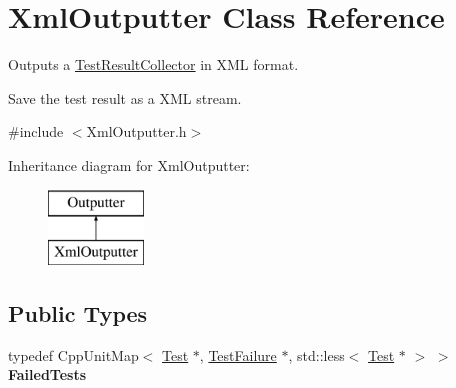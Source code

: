 \hypertarget{class_xml_outputter}{}\section{Xml\+Outputter Class Reference}
\label{class_xml_outputter}


Outputs a \hyperlink{class_test_result_collector}{Test\+Result\+Collector} in X\+ML format.

Save the test result as a X\+ML stream.  




{\ttfamily \#include $<$Xml\+Outputter.\+h$>$}

Inheritance diagram for Xml\+Outputter\+:\begin{figure}[H]
\begin{center}
\leavevmode
\includegraphics[height=2.000000cm]{class_xml_outputter}
\end{center}
\end{figure}
\subsection*{Public Types}
\begin{DoxyCompactItemize}
\item 
typedef Cpp\+Unit\+Map$<$ \hyperlink{class_test}{Test} $\ast$, \hyperlink{class_test_failure}{Test\+Failure} $\ast$, std\+::less$<$ \hyperlink{class_test}{Test} $\ast$ $>$ $>$ {\bfseries Failed\+Tests}\hypertarget{class_xml_outputter_a987608d04ba56dcc13461c9522f3da7e}{}\label{class_xml_outputter_a987608d04ba56dcc13461c9522f3da7e}

\end{DoxyCompactItemize}
